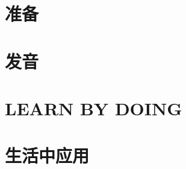 \documentclass{ctexbook}
\begin{document}

\frontmatter{}
\tableofcontents{}
\mainmatter{}

\part{准备}



\part{发音}





\part{LEARN BY DOING}

\part{生活中应用}



\backmatter{}
\end{document}
